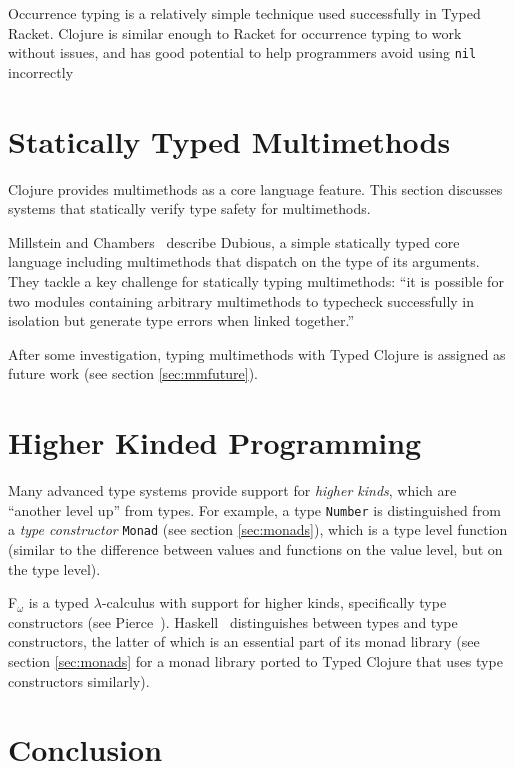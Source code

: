 Occurrence typing is a relatively simple technique used successfully 
in Typed Racket. Clojure is similar enough to Racket for occurrence typing to work
without issues, and has good potential to help programmers avoid using
\lstinline|nil| incorrectly

\section{Statically Typed Multimethods}

Clojure provides multimethods as a core language feature. This section discusses systems that statically
verify type safety for multimethods.

Millstein and Chambers~\cite{MS02}
describe Dubious, a simple statically typed core language including multimethods that
dispatch on the type of its arguments. They tackle a key challenge for statically typing
multimethods: ``it is possible for two modules containing arbitrary multimethods to typecheck
successfully in isolation but generate type errors when linked together.''~\cite{MS02}

After some investigation, typing multimethods with Typed Clojure is assigned as future work
(see section \ref{sec:mmfuture}).

\section{Higher Kinded Programming}

Many advanced type systems provide support for \emph{higher kinds},
which are ``another level up'' from types.
For example, a type \lstinline|Number| is distinguished from a
\emph{type constructor} \lstinline|Monad| (see section \ref{sec:monads}), which is a type level function
(similar to the difference between values and functions on the value level, but on the type level).

F$_\omega$ is a typed $\lambda$-calculus with support for higher kinds,
specifically type constructors (see Pierce~\cite{Pie02}).
Haskell~\cite{Mar10} distinguishes between types and type constructors,
the latter of which is an essential part of its monad library 
(see section \ref{sec:monads} for a monad library ported to Typed Clojure
that uses type constructors similarly).

\section{Conclusion}

